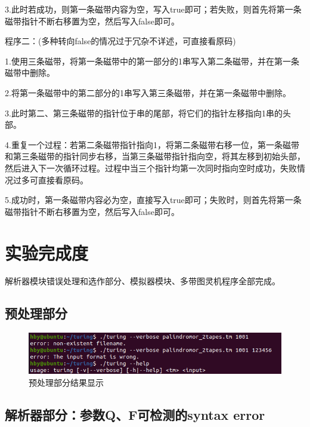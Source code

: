 \documentclass[UTF8]{article}
\begin{document}
3.此时若成功，则第一条磁带内容为空，写入true即可；若失败，则首先将第一条磁带指针不断右移置为空，然后写入false即可。

程序二：(多种转向false的情况过于冗杂不详述，可直接看原码)

1.使用三条磁带，将第一条磁带中的第一部分的1串写入第二条磁带，并在第一条磁带中删除。

2.将第一条磁带中的第二部分的1串写入第三条磁带，并在第一条磁带中删除。

3.此时第二、第三条磁带的指针位于串的尾部，将它们的指针左移指向1串的头部。

4.重复一个过程：若第二条磁带指针指向1，将第二条磁带右移一位，第一条磁带和第三条磁带的指针同步右移，当第三条磁带指针指向空，将其左移到初始头部，然后进入下一次循环过程。过程中当三个指针均第一次同时指向空时成功，失败情况过多可直接看原码。

5.成功时，第一条磁带内容必为空，直接写入true即可；失败时，则首先将第一条磁带指针不断右移置为空，然后写入false即可。


\section{实验完成度}   
解析器模块错误处理和选作部分、模拟器模块、多带图灵机程序全部完成。

\subsection{预处理部分}
\begin{figure}[h]
  \centering
  \includegraphics[scale=0.8]{pic4.png}
  \caption{预处理部分结果显示}
\end{figure}

\subsection{解析器部分：参数Q、F可检测的syntax error}
\end{document}
